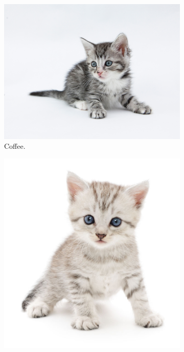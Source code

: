 \documentclass[12pt]{article}
\begin{document}
\begin{figure}[h!]
  \centering
  \begin{subfigure}[b]{0.3\linewidth}
    \includegraphics[width=\linewidth]{./kitten2.jpg}
     \caption{Coffee.}
  \end{subfigure}
  \begin{subfigure}[b]{0.3\linewidth}
    \includegraphics[width=\linewidth]{./kitten3.jpg}

\end{subfigure}
\end{figure}
\end{document}
